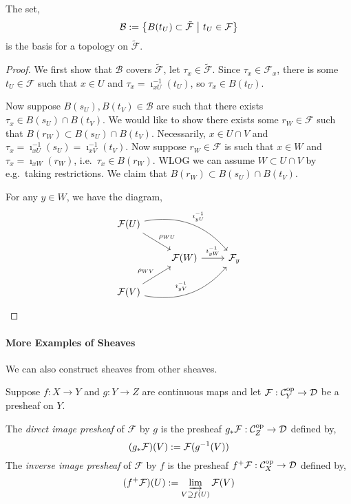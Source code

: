 \documentclass[000-main.tex]{subfiles}
\begin{document}
\begin{proposition}
  The set,
  \begin{displaymath}
    \mathcal{B} := \qty{B(t_U) \subset \tilde{\mathcal{F}}\ \middle|\ t_U \in \mathcal{F}}
  \end{displaymath}
  is the basis for a topology on $\tilde{\mathcal{F}}$.
\end{proposition}
\begin{proof}\TOPROVE%
  We first show that $\mathcal{B}$ covers $\tilde{\mathcal{F}}$, let $\tau_x \in \tilde{\mathcal{F}}$.
  Since $\tau_x \in \mathcal{F}_x$, there is some $t_U \in \mathcal{F}$ such that $x\in U$ and $\tau_x  = \imath^{-1}_{x U}(t_U)$, so $\tau_x\in B(t_U)$.

  Now suppose $B(s_U), B(t_V)\in \mathcal{B}$ are such that there exists $\tau_x\in B(s_U)\cap B(t_V)$.
  We would like to show there exists some $r_W\in \mathcal{F}$ such that $B(r_W)\subset B(s_U)\cap B(t_V)$.
  Necessarily, $x\in U\cap V$ and $\tau_x = \imath^{-1}_{x U}(s_U) = \imath^{-1}_{x V}(t_V)$.
  Now suppose $r_W\in \mathcal{F}$ is such that $x\in W$ and $\tau_x = \imath_{x W}(r_W)$, i.e.\ $\tau_x\in B(r_W)$.
  WLOG we can assume $W\subset U\cap V$ by e.g.\ taking restrictions.
  We claim that $B(r_W)\subset B(s_U)\cap B(t_V)$.

  For any $y\in W$, we have the diagram,
  \begin{displaymath}
    \begin{tikzcd}
      \mathcal{F}(U)
      \arrow[drr, bend left, "\imath_{yU}^{-1}"]
      \arrow[dr, "\rho_{WU}"]
      &&\\
      & \mathcal{F}(W)
      \arrow[r, "\imath_{yW}^{-1}"]
      & \mathcal{F}_y\\
      \mathcal{F}(V)
      \arrow[urr, bend right, "\imath_{yV}^{-1}"]
      \arrow[ur, "\rho_{WV}"]
    \end{tikzcd}
  \end{displaymath}
\end{proof}


\paragraph{More Examples of Sheaves}

We can also construct sheaves from other sheaves.
\begin{definition}
  Suppose $f: X\to Y$ and $g: Y\to Z$ are continuous maps and let $\mathcal{F}: \mathcal{C}_Y^{\text{op}} \to \mathcal{D}$ be a presheaf on $Y$.

  The \emph{direct image presheaf} of $\mathcal{F}$ by $g$ is the presheaf ${{g}_{*}}\mathcal{F}: \mathcal{C}_Z^{\text{op}}\to \mathcal{D}$ defined by,
  \begin{displaymath}
    ({{g}_{*}}\mathcal{F})(V) := \mathcal{F}(g^{-1}(V))
  \end{displaymath}
  The \emph{inverse image presheaf} of $\mathcal{F}$ by $f$ is the presheaf $f^{+}\mathcal{F}: \mathcal{C}_X^{\text{op}}\to \mathcal{D}$ defined by,
  \begin{displaymath}
    (f^{+}\mathcal{F})(U) := \varinjlim_{V\supseteq f(U)}\mathcal{F}(V)
  \end{displaymath}
\end{definition}
\end{document}
